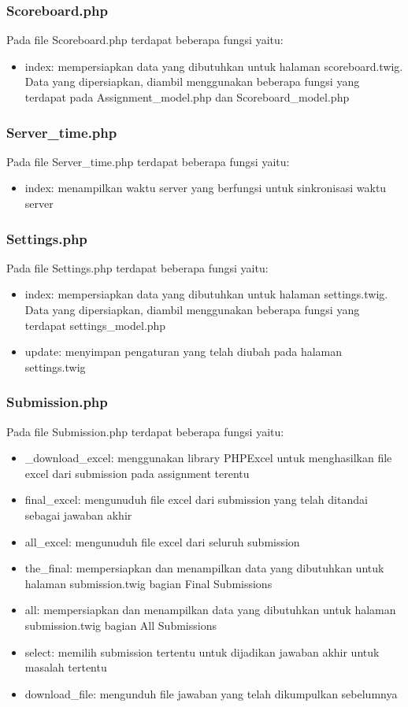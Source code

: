 \subsubsection{Scoreboard.php}
Pada file Scoreboard.php terdapat beberapa fungsi yaitu:
\begin{itemize}
	\item index: mempersiapkan data yang dibutuhkan untuk halaman scoreboard.twig. Data yang dipersiapkan, diambil menggunakan beberapa fungsi yang terdapat pada Assignment\_model.php dan Scoreboard\_model.php
\end{itemize}

\subsubsection{Server\_time.php}
Pada file Server\_time.php terdapat beberapa fungsi yaitu:
\begin{itemize}
	\item index: menampilkan waktu server yang berfungsi untuk sinkronisasi waktu server
\end{itemize}

\subsubsection{Settings.php}
Pada file Settings.php terdapat beberapa fungsi yaitu:
\begin{itemize}
	\item index: mempersiapkan data yang dibutuhkan untuk halaman settings.twig. Data yang dipersiapkan, diambil menggunakan beberapa fungsi yang terdapat settings\_model.php
	\item update: menyimpan pengaturan yang telah diubah pada halaman settings.twig
\end{itemize}

\subsubsection{Submission.php}
Pada file Submission.php terdapat beberapa fungsi yaitu:
\begin{itemize}
	\item \_download\_excel: menggunakan library PHPExcel untuk menghasilkan file excel dari submission pada assignment terentu
	\item final\_excel: mengunuduh file excel dari submission yang telah ditandai sebagai jawaban akhir
	\item all\_excel: mengunuduh file excel dari seluruh submission
	\item the\_final: mempersiapkan dan menampilkan data yang dibutuhkan untuk halaman submission.twig bagian Final Submissions
	\item all: mempersiapkan dan menampilkan data yang dibutuhkan untuk halaman submission.twig bagian All Submissions
	\item select: memilih submission tertentu untuk dijadikan jawaban akhir untuk masalah tertentu
	\item download\_file: mengunduh file jawaban yang telah dikumpulkan sebelumnya
\end{itemize}

